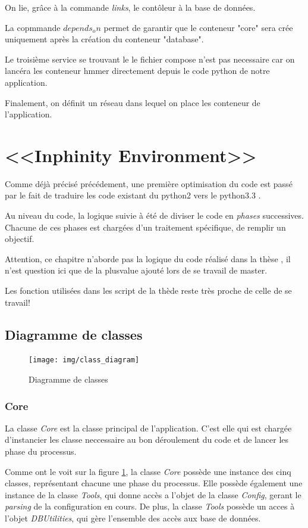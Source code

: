 On lie, grâce à la commande \emph{links}, le contôleur à la base de données.

La copmmande \emph{$depends_on$} permet de garantir que le conteneur "core" sera crée uniquement après la création du conteneur "database".

Le troisième service se trouvant le le fichier compose n'est pas necessaire car on lancéra les conteneur hmmer directement depuis le code python de notre application. 

Finalement, on définit un réseau dans lequel on place les conteneur de l'application.

\section{<<Inphinity Environment>>}

Comme déjà précisé précédement, une première optimisation du code est passé par le fait de traduire les code existant du python2 vers le python3.3 .

Au niveau du code, la logique suivie à été de diviser le code en \emph{phases} successives. Chacune de ces phases est chargées d'un traitement spécifique, de remplir un objectif.

Attention, ce chapitre n'aborde pas la logique du code réalisé dans la thèse \thLeite , il n'est question ici que de la plusvalue ajouté lors de se travail de master.

Les fonction utilisées dans les script de la thède \thLeite reste très proche de celle de se travail!

\subsection{Diagramme de classes}
\begin{figure}[H] 
\centering 
\texttt{[image: img/class\_diagram]} 
\caption[classdiagram]{Diagramme de classes}
\label{fig:classdiagram} 
\end{figure}

\subsubsection{Core}
La classe \emph{Core} est la classe principal de l'application. C'est elle qui est chargée d'instancier les classe neccessaire au bon déroulement du code et de lancer les phase du processus.

Comme ont le voit sur la figure \ref{fig:classdiagram}, la classe \emph{Core} possède une instance des cinq classes, représentant chacune une phase du processus. Elle possède également une instance de la classe \emph{Tools}, qui donne accès a l'objet de la classe \emph{Config}, gerant le \emph{parsing} de la configuration en cours. De plus, la classe \emph{Tools} possède un acces à l'objet \emph{DBUtilities}, qui gère l'ensemble des accès aux base de données.

